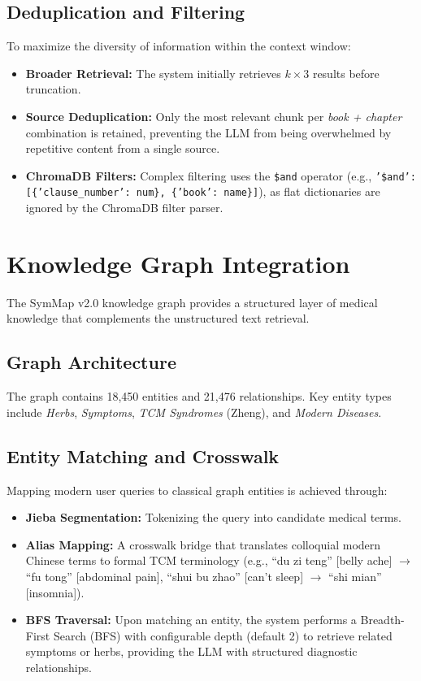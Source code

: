 \subsection{Deduplication and Filtering}
To maximize the diversity of information within the context window:
\begin{itemize}
    \item \textbf{Broader Retrieval:} The system initially retrieves $k \times 3$ results before truncation.
    \item \textbf{Source Deduplication:} Only the most relevant chunk per \textit{book + chapter} combination is retained, preventing the LLM from being overwhelmed by repetitive content from a single source.
    \item \textbf{ChromaDB Filters:} Complex filtering uses the \texttt{\$and} operator (e.g., \texttt{'\$and': [\{'clause\_number': num\}, \{'book': name\}]}), as flat dictionaries are ignored by the ChromaDB filter parser.
\end{itemize}

\section{Knowledge Graph Integration}

The SymMap v2.0 knowledge graph provides a structured layer of medical knowledge that complements the unstructured text retrieval.

\subsection{Graph Architecture}
The graph contains 18,450 entities and 21,476 relationships. Key entity types include \textit{Herbs}, \textit{Symptoms}, \textit{TCM Syndromes} (Zheng), and \textit{Modern Diseases}.

\subsection{Entity Matching and Crosswalk}
Mapping modern user queries to classical graph entities is achieved through:
\begin{itemize}
    \item \textbf{Jieba Segmentation:} Tokenizing the query into candidate medical terms.
    \item \textbf{Alias Mapping:} A crosswalk bridge that translates colloquial modern Chinese terms to formal TCM terminology (e.g., ``du zi teng'' [belly ache] $\rightarrow$ ``fu tong'' [abdominal pain], ``shui bu zhao'' [can't sleep] $\rightarrow$ ``shi mian'' [insomnia]).
    \item \textbf{BFS Traversal:} Upon matching an entity, the system performs a Breadth-First Search (BFS) with configurable depth (default 2) to retrieve related symptoms or herbs, providing the LLM with structured diagnostic relationships.
\end{itemize}

